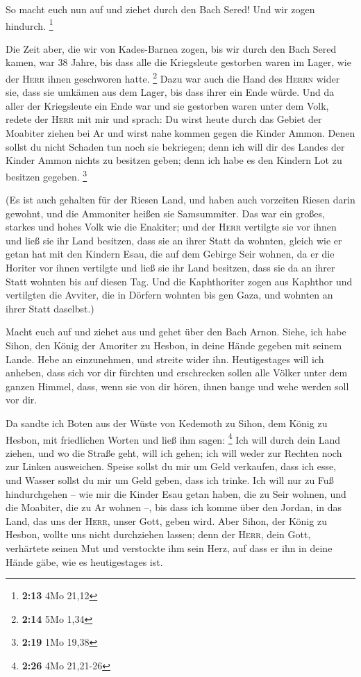  So macht euch nun auf und ziehet durch den Bach Sered!
Und wir zogen hindurch. \footnote{\textbf{2:13} 4Mo 21,12}

 Die Zeit aber, die wir von Kades-Barnea zogen, bis wir
durch den Bach Sered kamen, war 38 Jahre, bis dass alle die Kriegsleute
gestorben waren im Lager, wie der \textsc{Herr} ihnen geschworen hatte.
\footnote{\textbf{2:14} 5Mo 1,34}  Dazu war auch die Hand
des \textsc{Herrn} wider sie, dass sie umkämen aus dem Lager, bis dass
ihrer ein Ende würde.  Und da aller der Kriegsleute ein
Ende war und sie gestorben waren unter dem Volk,  redete
der \textsc{Herr} mit mir und sprach:  Du wirst heute
durch das Gebiet der Moabiter ziehen bei Ar  und wirst
nahe kommen gegen die Kinder Ammon. Denen sollst du nicht Schaden tun
noch sie bekriegen; denn ich will dir des Landes der Kinder Ammon nichts
zu besitzen geben; denn ich habe es den Kindern Lot zu besitzen gegeben.
\footnote{\textbf{2:19} 1Mo 19,38}

 (Es ist auch gehalten für der Riesen Land, und haben
auch vorzeiten Riesen darin gewohnt, und die Ammoniter heißen sie
Samsummiter.  Das war ein großes, starkes und hohes Volk
wie die Enakiter; und der \textsc{Herr} vertilgte sie vor ihnen und ließ
sie ihr Land besitzen, dass sie an ihrer Statt da wohnten,
 gleich wie er getan hat mit den Kindern Esau, die auf
dem Gebirge Seir wohnen, da er die Horiter vor ihnen vertilgte und ließ
sie ihr Land besitzen, dass sie da an ihrer Statt wohnten bis auf diesen
Tag.  Und die Kaphthoriter zogen aus Kaphthor und
vertilgten die Avviter, die in Dörfern wohnten bis gen Gaza, und wohnten
an ihrer Statt daselbst.)

 Macht euch auf und ziehet aus und gehet über den Bach
Arnon. Siehe, ich habe Sihon, den König der Amoriter zu Hesbon, in deine
Hände gegeben mit seinem Lande. Hebe an einzunehmen, und streite wider
ihn.  Heutigestages will ich anheben, dass sich vor dir
fürchten und erschrecken sollen alle Völker unter dem ganzen Himmel,
dass, wenn sie von dir hören, ihnen bange und wehe werden soll vor dir.

 Da sandte ich Boten aus der Wüste von Kedemoth zu Sihon,
dem König zu Hesbon, mit friedlichen Worten und ließ ihm sagen:
\footnote{\textbf{2:26} 4Mo 21,21-26}  Ich will durch
dein Land ziehen, und wo die Straße geht, will ich gehen; ich will weder
zur Rechten noch zur Linken ausweichen.  Speise sollst du
mir um Geld verkaufen, dass ich esse, und Wasser sollst du mir um Geld
geben, dass ich trinke. Ich will nur zu Fuß hindurchgehen --
 wie mir die Kinder Esau getan haben, die zu Seir wohnen,
und die Moabiter, die zu Ar wohnen --, bis dass ich komme über den
Jordan, in das Land, das uns der \textsc{Herr}, unser Gott, geben wird.
 Aber Sihon, der König zu Hesbon, wollte uns nicht
durchziehen lassen; denn der \textsc{Herr}, dein Gott, verhärtete seinen
Mut und verstockte ihm sein Herz, auf dass er ihn in deine Hände gäbe,
wie es heutigestages ist.

